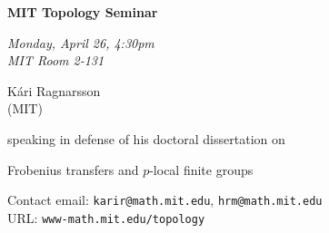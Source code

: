 \documentclass{slides}
\begin{document}
\begin{center}

{\fontsize {54pt}{40pt}\selectfont

\textrm{
{\textbf{MIT Topology Seminar}}}
}
\medskip

{\large\textrm{\emph{Monday, April 26, 4:30pm\\MIT Room 2-131}}}



\bigskip

\textrm{{\LARGE K\'ari Ragnarsson  \\[.5cm](MIT)}}

\bigskip\bigskip\bigskip
\textrm{speaking in defense of his doctoral dissertation on}
\bigskip\bigskip\bigskip

\textrm{\LARGE Frobenius transfers and $p$-local finite groups}\\

\end{center}

\vspace{1cm}

{\small
\textrm{Contact email: } \texttt{karir@math.mit.edu}, \texttt{hrm@math.mit.edu}\\
\textrm{URL: } \texttt{www-math.mit.edu/topology}
}
\end{document}
